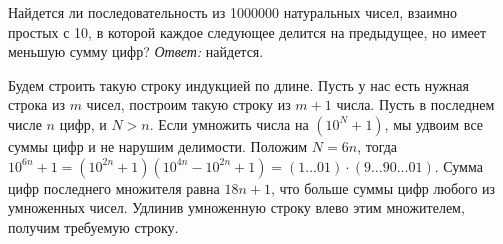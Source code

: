 \problem
Найдется ли последовательность из 1000000 натуральных чисел, взаимно простых с
10, в которой каждое следующее делится на предыдущее, но имеет меньшую сумму
цифр?
\solution
\emph{Ответ:} найдется.
\par
Будем строить такую строку индукцией по длине.
Пусть у нас есть нужная строка из $m$ чисел, построим такую строку из $m + 1$
числа.
Пусть в последнем числе $n$ цифр, и $N > n$.
Если умножить числа на $(10^N + 1)$, мы удвоим все суммы цифр и не нарушим
делимости.
Положим $N = 6 n$, тогда
\(
    10^{6 n} + 1
=
    (10^{2n} + 1) (10^{4n} - 10^{2n} + 1)
=
    (1\ldots01) \cdot (9\ldots90\ldots01)
\).
Сумма цифр последнего множителя равна $18 n + 1$, что больше суммы цифр любого
из умноженных чисел.
Удлинив умноженную строку влево этим множителем, получим требуемую строку.
\endproblem
